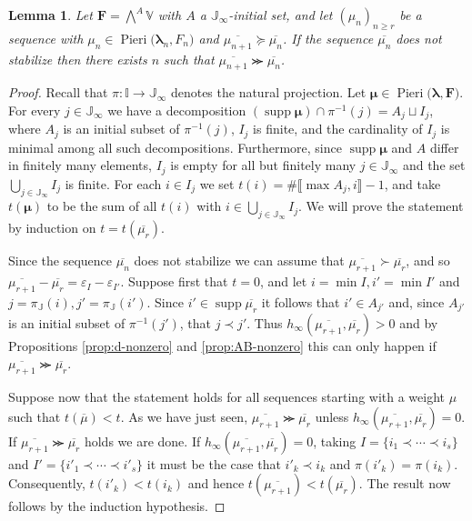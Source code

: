 \documentclass[11pt,fleqn]{amsart}
\newcommand\II{\mathbb I}
\newcommand\JJ{\mathbb J}
\renewcommand\to{\longrightarrow}
\renewcommand\epsilon{\varepsilon}
\newtheorem{lem}[thm]{Lemma}
\theoremstyle{definition}
\theoremstyle{remark}
\theoremstyle{remark}
\newcommand\VV{\mathbb V}
\newcommand\interval[1]{\llbracket{#1}\rrbracket}
\newcommand\wt[1]{\boldsymbol{#1}}
\DeclareMathOperator\supp{supp}
\newcommand\Pieri[2]{\operatorname{Pieri}{(#1},{#2)}}
\begin{document}
\begin{lem}
Let $\mathbf F = \bigwedge^A \VV$ with $A$ a $\JJ_\infty$-initial set, and let 
$(\mu_n)_{n \geq r}$ be a sequence with $\mu_n \in \Pieri{\wt\lambda_n}
{F_n}$ and $\overline{\mu_{n+1}} \succeq \overline{\mu_n}$. If the sequence 
$\overline{\mu_n}$ does not stabilize then there exists $n$ such that 
$\overline{\mu_{n+1}} \ggcurly \overline{\mu_n}$.
\end{lem}
\begin{proof}
Recall that $\pi: \II \to \JJ_\infty$ denotes the natural projection.
Let $\wt\mu \in \Pieri{\wt\lambda}{\mathbf F}$. For every $j \in \JJ_\infty$ 
we have a decomposition $(\supp \wt\mu) \cap \pi^{-1}(j) = A_{j} \sqcup I_{j}$, 
where $A_{j}$ is an initial subset of $\pi^{-1}(j)$, $I_{j}$ is finite, and 
the cardinality of $I_j$ is minimal among all such decompositions. 
Furthermore, since $\supp \wt\mu$ and $A$ differ in finitely many elements, 
$I_{j}$ is empty for all but finitely many $j \in \JJ_{\infty}$ and the set 
$\bigcup_{j \in \JJ_\infty} I_{j}$ is finite. For each $i \in I_{j}$ we 
set $t(i) = \# \interval{\max A_{j}, i} - 1$, and take $t(\wt\mu)$ to be the 
sum of all $t(i)$ with $i \in \bigcup_{j \in \JJ_\infty} I_{j}$. We will 
prove the statement by induction on $t = t(\overline{\mu_{r}})$.

Since the sequence $\overline{\mu_n}$ does not stabilize we can assume that 
$\overline{\mu_{r+1}} \succ \overline{\mu_{r}}$, and so $\overline{\mu_{r+1}} 
- \overline{\mu_{r}} = \epsilon_I - \epsilon_{I'}$. Suppose first that $t = 0$, 
and let $i = \min I, i' = \min I'$ and $j = \pi_{\JJ}(i), j' = \pi_{\JJ}(i')$. 
Since $i' \in \supp \overline{\mu_{r}}$ it follows that $i' \in A_{j'}$ and, 
since $A_{j'}$ is an initial subset of $\pi^{-1}(j')$, that $j \prec j'$. Thus 
$h_\infty(\overline{\mu_{r+1}}, \overline{\mu_{r}}) > 0$ and by Propositions 
\ref{prop:d-nonzero} and \ref{prop:AB-nonzero} this can only happen if 
$\overline{\mu_{r+1}} \ggcurly \overline{\mu_{r}}$.

Suppose now that the statement holds for all sequences starting with a weight 
$\mu$ such that $t(\overline{\mu}) < t$. As we have just seen, $\overline{
\mu_{r+1}} \ggcurly \overline{\mu_{r}}$ unless $h_\infty(\overline{\mu_{r+1}}, 
\overline{\mu_{r}}) = 0$. If $\overline{\mu_{r+1}} \ggcurly \overline{\mu_{r}}$ 
holds we are done. If $h_\infty(\overline{\mu_{r+1}}, \overline{\mu_{r}}) = 0$, 
taking $I = \{i_1 \prec \cdots \prec i_s\}$ and $I' = \{i'_1 \prec \cdots \prec 
i'_s\}$ it must be the case that $i'_k \prec i_k$ and $\pi(i'_k) = \pi(i_k)$. 
Consequently, $t(i'_k) < t(i_k)$ and hence $t(\overline{\mu_{r+1}}) < 
t(\overline{\mu_{r}})$. The result now follows by the induction hypothesis.
\end{proof}
\end{document}
